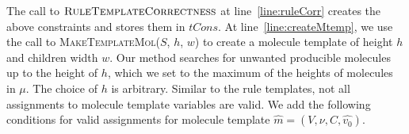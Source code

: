 The call to $\textsc{RuleTemplateCorrectness}$ at
line~\ref{line:ruleCorr} creates the above constraints
and stores them in $tCons$.
At line~\ref{line:createMtemp}, we use the call to \textsc{MakeTemplateMol}($S$, $h$, $w$) to
create a molecule template of height $h$ and children width $w$.
%
Our method searches for unwanted producible molecules up to the height of $h$,
which we set to the maximum of the heights of molecules in $\mu$.
%
The choice of $h$ is arbitrary.
%
Similar to the rule templates, not all assignments to molecule template variables
are valid.
We add the following conditions for
valid assignments for molecule template $\hat{m} = (V, \nu, C, \hat{v_0})$.
